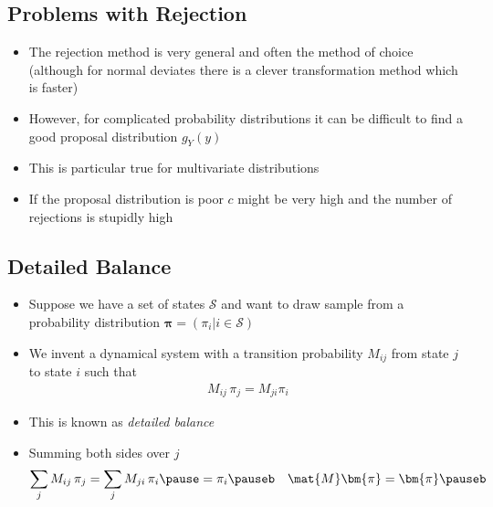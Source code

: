 \begin{slide}
\section{Problems with Rejection}

\begin{PauseHighLight}
  \begin{itemize}
  \item The rejection method is very general and often the method of
    choice (although for normal deviates there is a clever
    transformation method which is faster)\pause
  \item However, for complicated probability distributions it can be
    difficult to find a good proposal distribution $g_Y(y)$\pause
  \item This is particular true for multivariate distributions\pause
  \item If the proposal distribution is poor $c$ might be very high and
    the number of rejections is stupidly high\pause
  \end{itemize}
\end{PauseHighLight}

\end{slide}

\Outline %

\begin{slide}
\section[-1]{Detailed Balance}

\begin{PauseHighLight}
  \begin{itemize}
  \item Suppose we have a set of states $\mathcal{S}$ and want to draw
    sample from a probability distribution $\bm{\pi} = (\pi_i | i \in
    \mathcal{S})$\pause
  \item We invent a dynamical system with a transition probability $M_{ij}$ from state $j$ to
    state $i$ such that
    \begin{align*}
      M_{ij} \, \pi_j = M_{ji} \pi_i
    \end{align*}
  \item This is known as \emph{detailed balance}\pause
  \item Summing both sides over $j$
    \begin{align*}
      \sum_{j} M_{ij}\,\pi_j &= \sum_{j} M_{ji}\,\pi_i \pause = \pi_i\pauseb
      &
        \mat{M} \bm{\pi} = \bm{\pi}\pauseb
    \end{align*}
  \end{itemize}
\end{PauseHighLight}

\end{slide}

